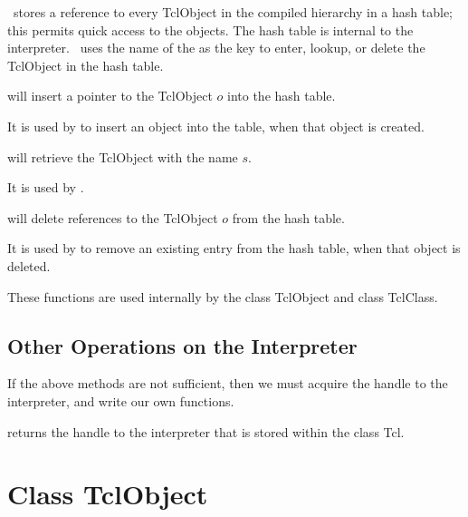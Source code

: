 \ns\ stores a reference to every TclObject in the compiled hierarchy
in a hash table;
this permits quick access to the objects.
The hash table is internal to the interpreter.
\ns\ uses the name of the  as the key
to enter, lookup, or delete the TclObject in the hash table.
\begin{list}{\textbullet}{}
\item {}
  will insert a pointer to the TclObject $o$ into the hash table.

  It is used by
  to insert an object into the table, when that object is created.

\item {}
  will retrieve the TclObject with the name $s$.

  It is used by
  .
\item {}
  will delete references to the TclObject $o$ from the hash table.

  It is used by
  to remove an existing entry from the hash table,
  when that object is deleted.
\end{list}
These functions are used internally by
the class TclObject and class TclClass.

\subsection{Other Operations on the Interpreter}
\label{sec:other}

If the above methods are not sufficient,
then we must acquire the handle to the interpreter,
and write our own functions.
\begin{list}{\textbullet}{}
\item {}
        returns the handle to the interpreter that is stored
        within the class Tcl.
\end{list}

\section{Class TclObject}
\label{sec:TclObject}

